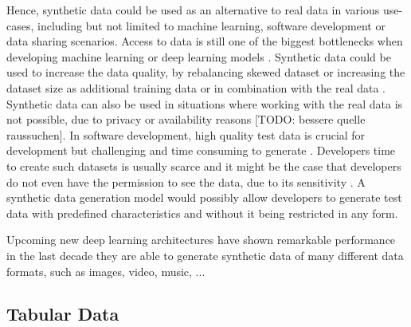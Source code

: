 Hence, synthetic data could be used as an alternative to real data in various use-cases,
including but not limited to machine learning, software development or data sharing scenarios.
Access to data is still one of the biggest bottlenecks when developing machine learning or deep learning \glspl{model} \cite{fan2020RelationalDataSynthesisa}.
Synthetic data could be used to increase the data quality, by rebalancing skewed dataset \cite{zhao2022CTABGANEnhancingTabular} 
or increasing the dataset size as additional training data or in combination with the real data \cite{leminh2021AirGenGANbasedSynthetica, kim2021OCTGANNeuralODEbased}.
Synthetic data can also be used in situations where working with the real data is not possible, due to privacy or availability reasons [TODO: bessere quelle raussuchen]\cite{zhao2022CTABGANEnhancingTabular}.
In software development, high quality test data is crucial for development but challenging and time consuming to generate \cite{whiting2008CreatingRealisticScenariobased}.
Developers time to create such datasets is usually scarce and it might be the case that developers do not even have the permission to see the data, due to its sensitivity \cite{whiting2008CreatingRealisticScenariobased}.
A synthetic data generation \gls{model} would possibly allow developers to generate test data with predefined characteristics and without it being restricted in any form.
 




Upcoming new deep learning architectures have shown remarkable performance in the last decade %
they are able to generate synthetic data of many different data formats, such as images, video, music, ... %






\subsection{Tabular Data}
\label{ch:preliminaries-dataSynthesis-tabularData}

